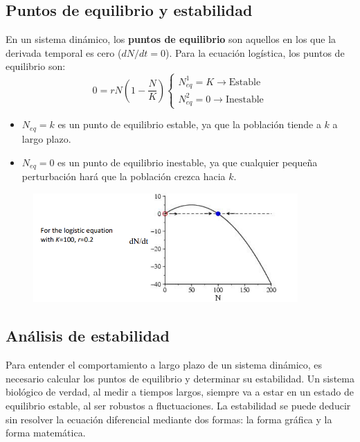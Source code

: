 \subsection{Puntos de equilibrio y estabilidad}
En un sistema dinámico, los \textbf{puntos de equilibrio} son aquellos en los que la derivada temporal es cero ($dN/dt = 0$). Para la ecuación logística, los puntos de equilibrio son:
$$0 = r N (1 - \frac{N}{K}) \begin{cases} 
N^1_{eq} = K \rightarrow \text{Estable} \\
N^2_{eq} = 0 \rightarrow \text{Inestable}
\end{cases}
$$

\begin{itemize}
\item $N_{eq} = k$ es un punto de equilibrio estable, ya que la población tiende a $k$ a largo plazo.
\item $N_{eq} = 0$ es un punto de equilibrio inestable, ya que cualquier pequeña perturbación hará que la población crezca hacia $k$.
\end{itemize}

\begin{figure}[h]
\centering
\includegraphics[width = 0.9\textwidth]{figs/estabilidad-dinamica.png}
\end{figure}

\subsection{Análisis de estabilidad}
Para entender el comportamiento a largo plazo de un sistema dinámico, es necesario calcular los puntos de equilibrio y determinar su estabilidad. 
Un sistema biológico de verdad, al medir a tiempos largos, siempre va a estar en un estado de equilibrio estable, al ser robustos a fluctuaciones. La estabilidad se puede deducir sin resolver la ecuación diferencial mediante dos formas: la forma gráfica y la forma matemática. 

